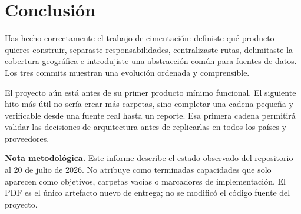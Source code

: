 \documentclass[11pt,a4paper]{article}
\begin{document}
\section{Conclusión}

Has hecho correctamente el trabajo de cimentación: definiste qué producto quieres construir, separaste responsabilidades, centralizaste rutas, delimitaste la cobertura geográfica e introdujiste una abstracción común para fuentes de datos. Los tres commits muestran una evolución ordenada y comprensible.

El proyecto aún está antes de su primer producto mínimo funcional. El siguiente hito más útil no sería crear más carpetas, sino completar una cadena pequeña y verificable desde una fuente real hasta un reporte. Esa primera cadena permitirá validar las decisiones de arquitectura antes de replicarlas en todos los países y proveedores.

\vfill
{\small\color{midgray}\textbf{Nota metodológica.} Este informe describe el estado observado del repositorio al 20 de julio de 2026. No atribuye como terminadas capacidades que solo aparecen como objetivos, carpetas vacías o marcadores de implementación. El PDF es el único artefacto nuevo de entrega; no se modificó el código fuente del proyecto.}
\end{document}
